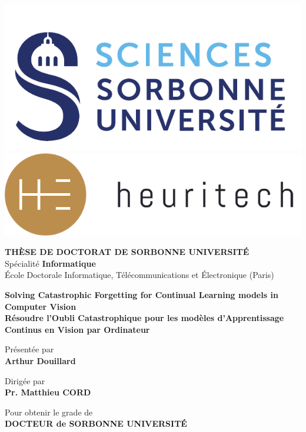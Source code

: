 \begin{titlepage}

  \vspace*{-2.5cm}
  \includegraphics[height=0.15\columnwidth]{images/sorbonne}
  \hspace*{2.5cm}
  \includegraphics[height=0.15\columnwidth]{images/heuritech}
  \vspace*{0.5cm}

  \begin{center}

    {\large \textbf{T\normalsize{HÈSE DE}\large{} D\normalsize{OCTORAT DE}\large{} S\normalsize{ORBONNE}\large{} U\normalsize{NIVERSITÉ}}}\\
    Spécialité \textbf{Informatique}\\
    École Doctorale Informatique, Télécommunications et Électronique (Paris)

    \vspace*{1.5cm}

    {\Large \textbf{Solving Catastrophic Forgetting for Continual Learning models in Computer Vision}} \\[0.5em]
    {\large \textbf{Résoudre l'Oubli Catastrophique pour les modèles d'Apprentissage Continus en Vision par Ordinateur}}

    \vspace*{1.2cm}

    Présentée par\\
    {\large \textbf{Arthur {Douillard}}}

    \vspace*{2mm}

    Dirigée par\\
    \textbf{Pr. Matthieu {CORD}}

    \vspace*{5mm}

    Pour obtenir le grade de \ \\
    \textbf{DOCTEUR de SORBONNE UNIVERSITÉ} \ \\


\end{center}
\end{titlepage}
